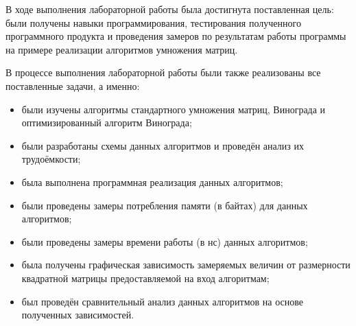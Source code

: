 В ходе выполнения лабораторной работы была достигнута поставленная цель: были получены навыки программирования, тестирования полученного программного продукта и проведения замеров по результатам работы программы на примере реализации алгоритмов умножения матриц.

В процессе выполнения лабораторной работы были также реализованы все поставленные задачи, а именно:
\begin{itemize}
	\item были изучены алгоритмы стандартного умножения матриц, Винограда и оптимизированный алгоритм Винограда;
	\item были разработаны схемы данных алгоритмов и проведён анализ их трудоёмкости;
	\item была выполнена программная реализация данных алгоритмов;
	\item были проведены замеры потребления памяти (в байтах) для данных алгоритмов; 
	\item были проведены замеры времени работы (в нс) данных алгоритмов; 
	\item была получены графическая зависимость замеряемых величин от размерности квадратной матрицы предоставляемой на вход алгоритмам;
	\item был проведён сравнительный анализ данных алгоритмов на основе полученных зависимостей.
\end{itemize}

\newpage
